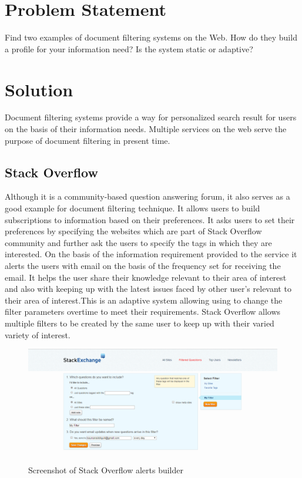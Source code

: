 \documentclass[12pt]{report}
\begin{document}
\section{Problem Statement}
Find two examples of document filtering systems on the Web. How do they build a profile for your information need? Is the system static or adaptive?
\section{Solution}
Document filtering systems provide a way for personalized search result for users on the basis of their information needs. Multiple services on the web serve the purpose of document filtering in present time.
\subsection{Stack Overflow}
Although it is a community-based question answering forum, it also serves as a good example for document filtering technique. It allows users to build subscriptions to information based on their preferences. It asks users to set their preferences by specifying the websites which are part of Stack Overflow community and further ask the users to specify the tags in which they are interested. On the basis of the information requirement provided to the service it alerts the users with email on the basis of the frequency set for receiving the email. It helps the user share their knowledge relevant to their area of interest and also with keeping up with the latest issues faced by other user's relevant to their area of interest.This is an adaptive system allowing using to change the filter parameters overtime to meet their requirements. Stack Overflow allows multiple filters to be created  by the same user to keep up with their varied variety of interest.  

\begin{figure}[ht]
  \centering
  \includegraphics[width=1\textwidth]{Problem10_6/Stackoverflow.png}
  \caption{Screenshot of Stack Overflow alerts builder}
  \label{fig:1}
\end{figure} 
\end{document}
